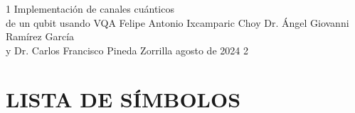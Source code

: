 \documentclass[letterpaper,12pt]{thesisECFM}
\theoremstyle{plain}
\theoremstyle{definition}
\theoremstyle{definition}
\theoremstyle{remark}
\newcommand{\1}{\mathbb{1}}
\begin{document}
\datosThesis%
{1}%
{Implementación de canales cuánticos \\ de un qubit usando VQA}%
{Felipe Antonio Ixcamparic Choy}%
{Dr. Ángel Giovanni Ramírez García\\y Dr. Carlos Francisco Pineda Zorrilla}%
{agosto de 2024}		%
{2}							%

\frontmatter
\tableofcontents    %
\chapter*{LISTA DE SÍMBOLOS} %
{}
\end{document}
